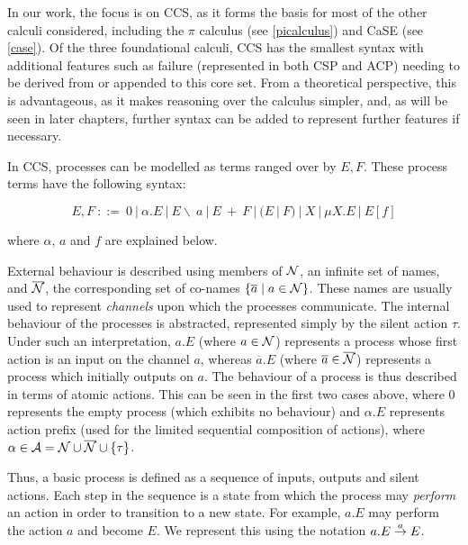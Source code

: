 In our work, the focus is on CCS, as it forms the basis for most of
the other calculi considered, including the $\pi$ calculus
\cite{picalctutorial} (see \ref{picalculus}) and CaSE \cite{CaSE} (see
\ref{case}).  Of the three foundational calculi, CCS has the smallest
syntax with additional features such as failure (represented in both
CSP and ACP) needing to be derived from or appended to this core set.
From a theoretical perspective, this is advantageous, as it makes
reasoning over the calculus simpler, and, as will be seen in later
chapters, further syntax can be added to represent further features if
necessary.

In CCS, processes can be modelled as terms ranged over by $E, F$.
These process terms have the following syntax:

\begin{equation}
\label{ccssyntax}
  E, F\ ::=\ 
  0\ |\ 
  \alpha.E\ |\ 
  E\backslash\ a\ |\ 
  E\ +\ F\ |\ 
  (E\ |\ F)\ |\ 
  X\ |\ 
  \mu X.E\ |\ 
  E[f] 
\end{equation}

\noindent where $\alpha$, $a$ and $f$ are explained below.

External behaviour is described using members of $\text{$\mathcal{N}$}$, an infinite
set of names, and $\overline{\text{$\mathcal{N}$}}$, the corresponding set of
co-names $\{\overline{a} \mid a \in \text{$\mathcal{N}$}\}$.  These names are usually
used to represent \emph{channels} upon which the processes
communicate.  The internal behaviour of the processes is abstracted,
represented simply by the silent action $\tau$.  Under such an
interpretation, $a.E$ (where $a \in \text{$\mathcal{N}$}$) represents a process
whose first action is an input on the channel $a$, whereas
$\overline{a}.E$ (where $\overline{a} \in \overline{\text{$\mathcal{N}$}}$)
represents a process which initially outputs on $a$.  The behaviour of
a process is thus described in terms of atomic actions.  This can be
seen in the first two cases above, where $0$ represents the empty
process (which exhibits no behaviour) and $\alpha.E$ represents action
prefix (used for the limited sequential composition of actions), where
$\alpha \in \text{$\mathcal{A}$} = \text{$\mathcal{N}$} \cup \overline{\text{$\mathcal{N}$}} \cup \{\tau\}$.

Thus, a basic process is defined as a sequence of inputs, outputs and
silent actions.  Each step in the sequence is a state from which the
process may \emph{perform} an action in order to transition to a new
state.  For example, $a.E$ may perform the action $a$ and become $E$.
We represent this using the notation $a.E \stackrel{a}{\rightarrow} E$.

